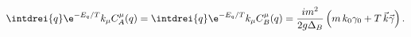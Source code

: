 \begin{equation}
\label{eq:cab}
  \intdrei{q} \e^{-E_q/T} k_\mu C^\mu_A(q) =\intdrei{q}
  \e^{-E_q/T} k_\mu C^\mu_B(q)
  =\frac{im^2}{2g\Delta_B}\left(m\,k_0\gamma_0+T\,\vec
  k\vec\gamma\right).
\end{equation}

